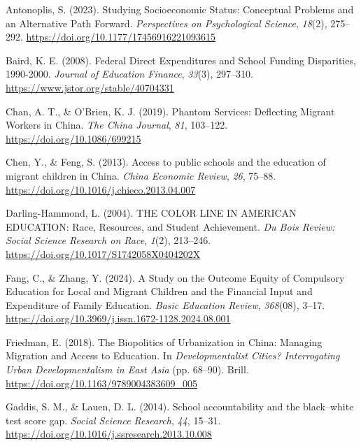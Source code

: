 \documentclass[
  man,
  floatsintext,
  longtable,
  nolmodern,
  notxfonts,
  notimes,
  colorlinks=true,linkcolor=blue,citecolor=blue,urlcolor=blue]{apa7}
\newlength{\cslhangindent}
\newenvironment{CSLReferences}[2] %
 {\begin{list}{}{%
  \setlength{\itemindent}{0pt}
  \setlength{\leftmargin}{0pt}
  \setlength{\parsep}{0pt}
  \ifodd #1
   \setlength{\leftmargin}{\cslhangindent}
   \setlength{\itemindent}{-1\cslhangindent}
  \fi
  \setlength{\itemsep}{#2\baselineskip}}}
 {\end{list}}
\begin{document}
\label{refs}
\begin{CSLReferences}{1}{0}
Antonoplis, S. (2023). Studying {Socioeconomic Status}: {Conceptual
Problems} and an {Alternative Path Forward}. \emph{Perspectives on
Psychological Science}, \emph{18}(2), 275--292.
\url{https://doi.org/10.1177/17456916221093615}

Baird, K. E. (2008). Federal {Direct Expenditures} and {School Funding
Disparities}, 1990-2000. \emph{Journal of Education Finance},
\emph{33}(3), 297--310. \url{https://www.jstor.org/stable/40704331}

Chan, A. T., \& O'Brien, K. J. (2019). Phantom {Services}: {Deflecting
Migrant Workers} in {China}. \emph{The China Journal}, \emph{81},
103--122. \url{https://doi.org/10.1086/699215}

Chen, Y., \& Feng, S. (2013). Access to public schools and the education
of migrant children in {China}. \emph{China Economic Review}, \emph{26},
75--88. \url{https://doi.org/10.1016/j.chieco.2013.04.007}

Darling-Hammond, L. (2004). {THE COLOR LINE IN AMERICAN EDUCATION}:
{Race}, {Resources}, and {Student Achievement}. \emph{Du Bois Review:
Social Science Research on Race}, \emph{1}(2), 213--246.
\url{https://doi.org/10.1017/S1742058X0404202X}

Fang, C., \& Zhang, Y. (2024). {A Study on the Outcome Equity of
Compulsory Education for Local and Migrant Children and the Financial
Input and Expenditure of Family Education}. \emph{Basic Education
Review}, \emph{368}(08), 3--17.
\url{https://doi.org/10.3969/j.issn.1672-1128.2024.08.001}

Friedman, E. (2018). The {Biopolitics} of {Urbanization} in {China}:
{Managing Migration} and {Access} to {Education}. In
\emph{Developmentalist {Cities}? {Interrogating Urban Developmentalism}
in {East Asia}} (pp. 68--90). Brill.
\url{https://doi.org/10.1163/9789004383609_005}

Gaddis, S. M., \& Lauen, D. L. (2014). School accountability and the
black--white test score gap. \emph{Social Science Research}, \emph{44},
15--31. \url{https://doi.org/10.1016/j.ssresearch.2013.10.008}


\end{CSLReferences}
\end{document}
